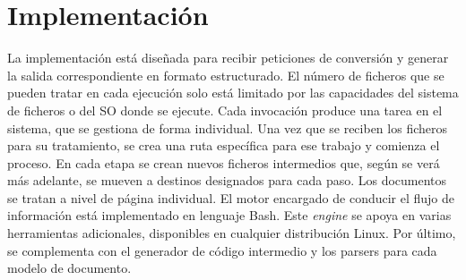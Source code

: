 
\chapter{Implementación}
\label{chap:implemetación}

La implementación está diseñada para recibir peticiones de conversión y generar la salida correspondiente en formato estructurado. El número de ficheros que se pueden tratar en cada ejecución solo está limitado por las capacidades del sistema de ficheros o del SO donde se ejecute. Cada invocación produce una tarea en el sistema, que se gestiona de forma individual. Una vez que se reciben los ficheros para su tratamiento, se crea una ruta específica para ese trabajo y comienza el proceso. En cada etapa se crean nuevos ficheros intermedios que, según se verá más adelante, se mueven a destinos designados para cada paso. Los documentos se tratan a nivel de página individual. El motor encargado de conducir el flujo de información está implementado en lenguaje Bash. Este \emph{engine} se apoya en varias herramientas adicionales, disponibles en cualquier distribución Linux. Por último, se complementa con el generador de código intermedio y los parsers para cada modelo de documento.





